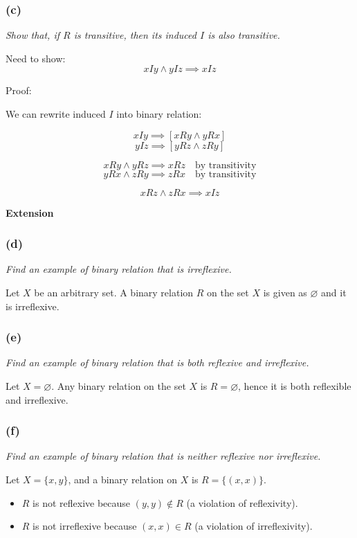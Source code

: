 \documentclass[a4paper]{article}
\begin{document}
\subsubsection*{(c)}

\textit{Show that, if $R$ is transitive, then its induced $I$ is also transitive.}

Need to show:
\[xIy \land yIz \implies xIz \]

Proof:

We can rewrite induced $I$ into binary relation:

\[xIy\implies [xRy \land yRx] \]
\[yIz\implies [yRz \land zRy] \]

\[xRy \land yRz \implies xRz \quad \text{by transitivity} \]
\[yRx \land zRy \implies zRx \quad \text{by transitivity} \]

\[xRz \land zRx \implies xIz \]

\textbf{Extension}

\subsubsection*{(d)}

\textit{Find an example of binary relation that is irreflexive.}

Let $X$ be an arbitrary set. A binary relation $R$ on the set $X$ is given as $\varnothing$ and it is irreflexive.

\subsubsection*{(e)}

\textit{Find an example of binary relation that is both reflexive and irreflexive.}

Let $X=\varnothing$. Any binary relation on the set $X$ is $R=\varnothing$, hence it is both reflexible and irreflexive.

\subsubsection*{(f)}

\textit{Find an example of binary relation that is neither reflexive nor irreflexive.}

Let $X=\{x, y\}$, and a binary relation on $X$ is $R=\{(x, x)\}$.
\begin{itemize}
    \item $R$ is not reflexive because $(y,y)\notin R$ (a violation of reflexivity).
    \item $R$ is not irreflexive because $(x,x)\in R$ (a violation of irreflexivity).
\end{itemize}
\end{document}
